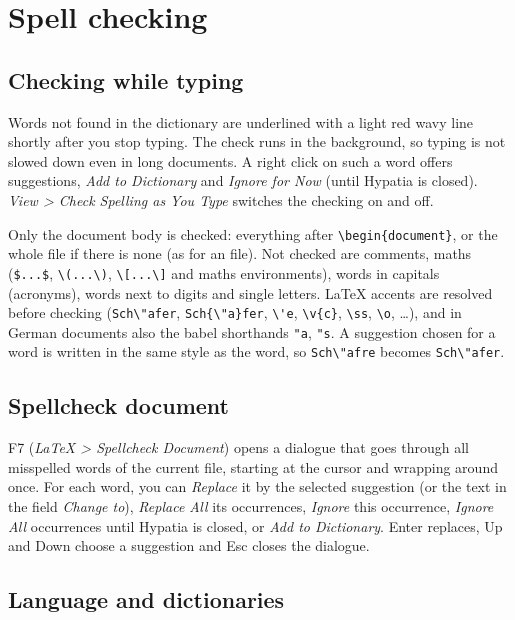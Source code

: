 \documentclass[11pt]{article}
\newcommand{\key}[1]{\textsf{#1}}
\newcommand{\menu}[1]{\textsf{\textit{#1}}}
\begin{document}
    \section{Spell checking}\label{sec:spelling}

    \subsection{Checking while typing}

    Words not found in the dictionary are underlined with a light red wavy line shortly after you stop typing. The check runs in the background, so typing is not slowed down even in long documents. A right click on such a word offers suggestions, \menu{Add to Dictionary} and \menu{Ignore for Now} (until Hypatia is closed). \menu{View > Check Spelling as You Type} switches the checking on and off.

    Only the document body is checked: everything after \verb+\begin{document}+, or the whole file if there is none (as for an \verb++ file). Not checked are comments, maths (\verb+$...$+, \verb+\(...\)+, \verb+\[...\]+ and maths environments), words in capitals (acronyms), words next to digits and single letters. LaTeX accents are resolved before checking (\verb+Sch\"afer+, \verb+Sch{\"a}fer+, \verb+\'e+, \verb+\v{c}+, \verb+\ss+, \verb+\o+, \ldots), and in German documents also the babel shorthands \verb+"a+, \verb+"s+. A suggestion chosen for a word is written in the same style as the word, so \verb+Sch\"afre+ becomes \verb+Sch\"afer+.

    \subsection{Spellcheck document}

    \key{F7} (\menu{LaTeX > Spellcheck Document}) opens a dialogue that goes through all misspelled words of the current file, starting at the cursor and wrapping around once. For each word, you can \emph{Replace} it by the selected suggestion (or the text in the field \emph{Change to}), \emph{Replace All} its occurrences, \emph{Ignore} this occurrence, \emph{Ignore All} occurrences until Hypatia is closed, or \emph{Add to Dictionary}. \key{Enter} replaces, \key{Up} and \key{Down} choose a suggestion and \key{Esc} closes the dialogue.

    \subsection{Language and dictionaries}
\end{document}
